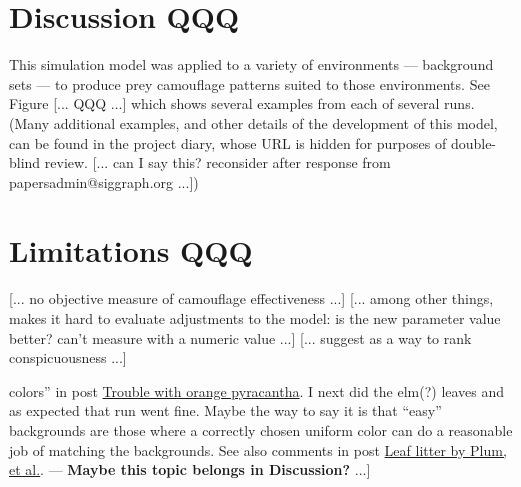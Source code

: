 \documentclass[acmtog]{acmart}
\begin{document}

\section{Discussion QQQ}
This simulation model was applied to a variety of environments — background sets — to produce prey camouflage patterns suited to those environments. See Figure [... QQQ ...] which shows several examples from each of several runs. (Many additional examples, and other details of the development of this model, can be found in the project diary, whose URL is hidden for purposes of double-blind review. [... can I say this? reconsider after response from papersadmin@siggraph.org ...])
\par
[... QQQ ...]
\par
[... QQQ ...]
\par


\section{Limitations QQQ}
\label{subsec:limitations}
[... no objective measure of camouflage effectiveness ...]
[... among other things, makes it hard to evaluate adjustments to the model: is the new parameter value better? can't measure with a numeric value ...]
[... suggest  \cite{lv_cod_2022} as a way to rank conspicuousness ...]
\par
[... See blog entry: \href{https://cwreynolds.github.io/TexSyn/#20220930}{Reliability: what \textit{is} the likelihood of camouflage?} see also comment “Perhaps the common issue is large areas of nearly uniform [but contrasting] colors” in post \href{https://cwreynolds.github.io/TexSyn/#20221119}{Trouble with orange pyracantha}. I next did the elm(?) leaves and as expected that run went fine. Maybe the way to say it is that “easy” backgrounds are those where a correctly chosen uniform color can do a reasonable job of matching the backgrounds. See also comments in post \href{https://cwreynolds.github.io/TexSyn/#20221122}{Leaf litter by Plum, et al.}. — \textbf{Maybe this topic belongs in Discussion?} ...]
\par
[... all results are hand selected, “cherry picked” ...] 
\par
[... in email to Ken I wrote: \textit{The aspect of my project I'm unsure how to approach is lack of rigor. My evaluations are all subjective. It comes down to “we can see that the effectiveness of the camouflage clearly increases during the simulation.”}]
\par
[... inherently 2d ...]
\par
[... texture synthesis lacks genetic or biological plausibility ...]
\par
\end{document}
